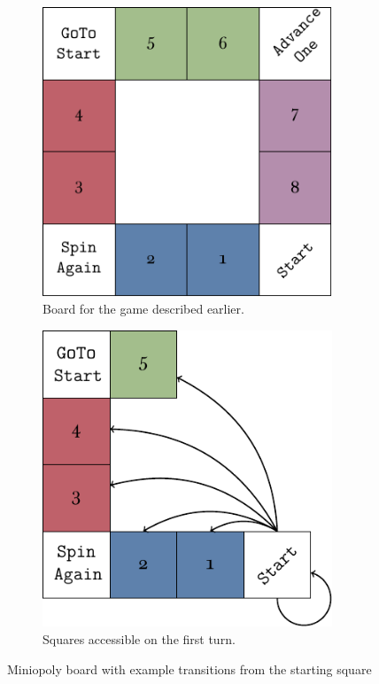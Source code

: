 \begin{figure}[h]
    \centering
	\begin{subfigure}[t]{0.45\textwidth}
		\centering
		\includegraphics[width=0.95\textwidth]{img/board.pdf}
		\caption{Board for the game described earlier.}
		\label{fig:miniopoly-board}
	\end{subfigure}
	\begin{subfigure}[t]{0.45\textwidth}
		\centering
		\includegraphics[width=0.95\textwidth]{img/diagram-start.pdf}
		\caption{Squares accessible on the first turn.}
		\label{fig:miniopoly-diagram-start}
	\end{subfigure}
    \caption{Miniopoly board with example transitions from the starting square}
    \label{figs:miniopoly-boards-transitions}
\end{figure}
